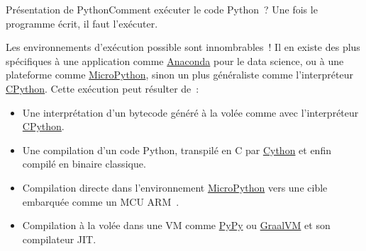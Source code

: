 \documentclass{beamer}
\begin{document}
    \begin{frame}{Présentation de Python}{Comment exécuter le code Python~?}
        Une fois le programme écrit, il faut l'exécuter.

        Les environnements d'exécution possible sont innombrables~!
        Il en existe des plus spécifiques à une application comme \href{https://www.anaconda.com/}{Anaconda} pour le data science, ou à une plateforme comme \href{https://micropython.org/}{MicroPython}, sinon un plus généraliste comme l'interpréteur \href{https://github.com/python/cpython}{CPython}.
        \bigbreak
        Cette exécution peut résulter de~:
        \begin{itemize}
            \item Une interprétation d'un bytecode généré à la volée comme avec l'interpréteur \href{https://github.com/python/cpython}{CPython}.
            \item Une compilation d'un code Python, transpilé en C par \href{https://cython.org/}{Cython} et enfin compilé en binaire classique.
            \item Compilation directe dans l'environnement \href{https://micropython.org/}{MicroPython} vers une cible embarquée comme un MCU ARM~.
            \item Compilation à la volée dans une VM comme \href{https://pypy.org/}{PyPy} ou \href{https://www.graalvm.org/python/}{GraalVM} et son compilateur JIT.
        \end{itemize}
    \end{frame}
\end{document}
